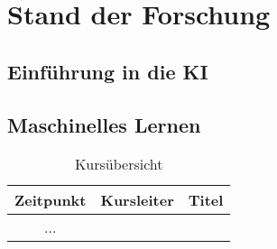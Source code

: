 \chapter{Stand der Forschung}
\section{Einführung in die KI}
\section{Maschinelles Lernen}

\begin{table}
\caption{ Kursübersicht}
\begin{tabular}{|c|c|c|}
\hline
Zeitpunkt & Kursleiter & Titel \\
\hline 
 ...   
\end{tabular}
\end{table}